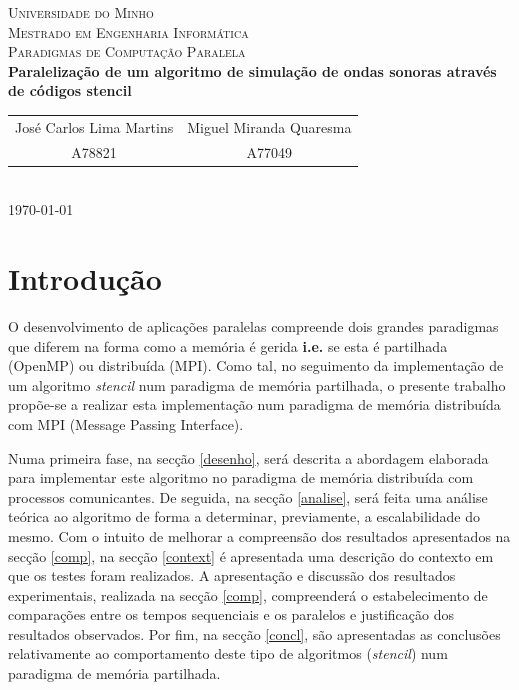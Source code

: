\documentclass{article}
\begin{document}
{
\center
\textsc{\Large Universidade do Minho} \\ [0.5cm]
\textsc{\Large Mestrado em Engenharia Informática} \\ [0.5cm]
\textsc{\large Paradigmas de Computação Paralela} \\ [0.5cm]

{\LARGE \bfseries Paralelização de um algoritmo de simulação de ondas sonoras através de códigos stencil} \\[0.5cm]

\begin{tabular}{c c}
    José Carlos Lima Martins & Miguel Miranda Quaresma \\
    A78821 & A77049  \\
\end{tabular} \\[0.5cm]

\today \\[1cm]
}

\section{Introdução}
O desenvolvimento de aplicações paralelas compreende dois grandes paradigmas 
que diferem na forma como a memória é gerida \textbf{i.e.} se esta é partilhada (OpenMP) ou
distribuída (MPI). Como tal, no seguimento da implementação de um algoritmo \textit{stencil}
num paradigma de memória partilhada, o presente trabalho propõe-se a realizar esta 
implementação num paradigma de memória distribuída com MPI (Message Passing Interface).

Numa primeira fase, na secção \ref{desenho}, será descrita a abordagem elaborada para 
implementar este algoritmo no paradigma de memória distribuída com processos comunicantes. 
De seguida, na secção \ref{analise}, será feita uma análise teórica ao algoritmo de forma a 
determinar, previamente, a escalabilidade do mesmo. Com o intuito de melhorar a compreensão dos
resultados apresentados na secção \ref{comp}, na secção \ref{context} é apresentada uma descrição
do contexto em que os testes foram realizados. A apresentação e discussão dos resultados 
experimentais, realizada na secção \ref{comp}, compreenderá o estabelecimento de comparações 
entre os tempos sequenciais e os paralelos e justificação dos resultados observados. 
Por fim, na secção \ref{concl}, são apresentadas as conclusões relativamente ao comportamento 
deste tipo de algoritmos (\textit{stencil}) num paradigma de memória partilhada.
\end{document}
